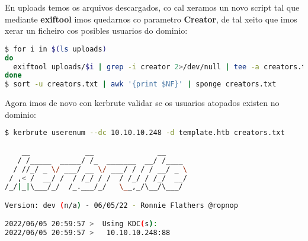 \documentclass[a4paper]{article}
\begin{document}
En uploads temos os arquivos descargados, co cal xeramos un novo script tal que mediante \textbf{exiftool} imos quedarnos co parametro \textbf{Creator}, de tal xeito que imos xerar un ficheiro cos posibles usuarios do dominio:
        \begin{lstlisting}[language=Bash, caption=Descargar documentos]
$ for i in $(ls uploads)
do
  exiftool uploads/$i | grep -i creator 2>/dev/null | tee -a creators.txt
done
$ sort -u creators.txt | awk '{print $NF}' | sponge creators.txt\end{lstlisting}

Agora imos de novo con kerbrute validar se os usuarios atopados existen no dominio:

        \begin{lstlisting}[language=Bash, caption=kerbrute]
$ kerbrute userenum --dc 10.10.10.248 -d template.htb creators.txt 

    __             __               __     
   / /_____  _____/ /_  _______  __/ /____ 
  / //_/ _ \/ ___/ __ \/ ___/ / / / __/ _ \
 / ,< /  __/ /  / /_/ / /  / /_/ / /_/  __/
/_/|_|\___/_/  /_.___/_/   \__,_/\__/\___/                                        

Version: dev (n/a) - 06/05/22 - Ronnie Flathers @ropnop

2022/06/05 20:59:57 >  Using KDC(s):
2022/06/05 20:59:57 >  	10.10.10.248:88


\end{lstlisting}
\end{document}
